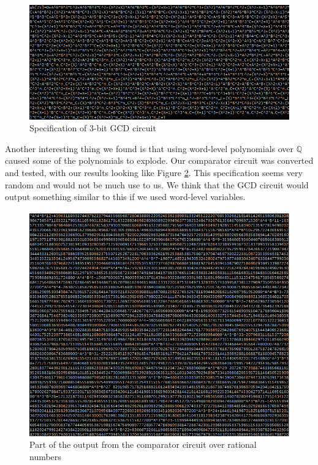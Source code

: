 \documentclass[12pt]{report}
\begin{document}
\begin{figure}
\includegraphics[scale=0.5]{images/ff_gcd_output.png}
\caption{Specification of 3-bit GCD circuit}
\label{fig:spec}
\end{figure}

Another interesting thing we found is that using word-level polynomials over $\mathbb{Q}$ caused some of the polynomials to explode. Our comparator circuit was converted and tested, with our results looking like Figure \ref{fig:boom}. This specification seems very random and would not be much use to us. We think that the GCD circuit would output something similar to this if we used word-level variables. 

\begin{figure}
\includegraphics[scale=0.5]{images/q_comp_output.png}
\caption{Part of the output from the comparator circuit over rational numbers}
\label{fig:boom}
\end{figure}
\end{document}
